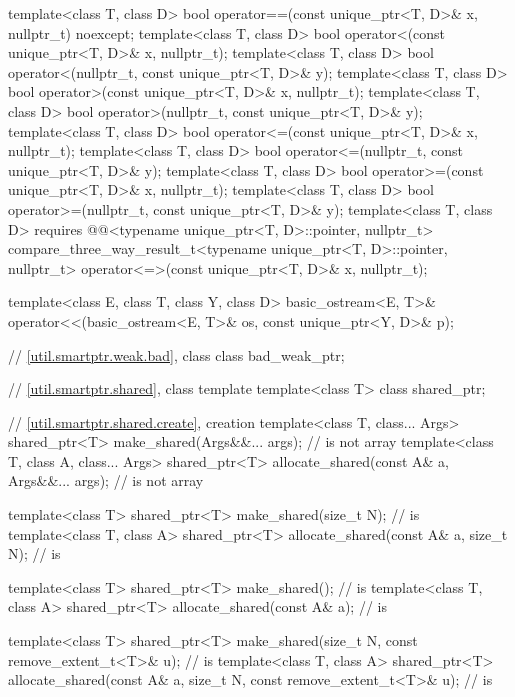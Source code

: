 \begin{codeblock}
{  template<class T, class D>
    bool operator==(const unique_ptr<T, D>& x, nullptr_t) noexcept;
  template<class T, class D>
    bool operator<(const unique_ptr<T, D>& x, nullptr_t);
  template<class T, class D>
    bool operator<(nullptr_t, const unique_ptr<T, D>& y);
  template<class T, class D>
    bool operator>(const unique_ptr<T, D>& x, nullptr_t);
  template<class T, class D>
    bool operator>(nullptr_t, const unique_ptr<T, D>& y);
  template<class T, class D>
    bool operator<=(const unique_ptr<T, D>& x, nullptr_t);
  template<class T, class D>
    bool operator<=(nullptr_t, const unique_ptr<T, D>& y);
  template<class T, class D>
    bool operator>=(const unique_ptr<T, D>& x, nullptr_t);
  template<class T, class D>
    bool operator>=(nullptr_t, const unique_ptr<T, D>& y);
  template<class T, class D>
    requires @@<typename unique_ptr<T, D>::pointer, nullptr_t>
    compare_three_way_result_t<typename unique_ptr<T, D>::pointer, nullptr_t>
      operator<=>(const unique_ptr<T, D>& x, nullptr_t);

  template<class E, class T, class Y, class D>
    basic_ostream<E, T>& operator<<(basic_ostream<E, T>& os, const unique_ptr<Y, D>& p);

  // \ref{util.smartptr.weak.bad}, class 
  class bad_weak_ptr;

  // \ref{util.smartptr.shared}, class template 
  template<class T> class shared_ptr;

  // \ref{util.smartptr.shared.create},  creation
  template<class T, class... Args>
    shared_ptr<T> make_shared(Args&&... args);                                  //  is not array
  template<class T, class A, class... Args>
    shared_ptr<T> allocate_shared(const A& a, Args&&... args);                  //  is not array

  template<class T>
    shared_ptr<T> make_shared(size_t N);                                        //  is 
  template<class T, class A>
    shared_ptr<T> allocate_shared(const A& a, size_t N);                        //  is 

  template<class T>
    shared_ptr<T> make_shared();                                                //  is 
  template<class T, class A>
    shared_ptr<T> allocate_shared(const A& a);                                  //  is 

  template<class T>
    shared_ptr<T> make_shared(size_t N, const remove_extent_t<T>& u);           //  is 
  template<class T, class A>
    shared_ptr<T> allocate_shared(const A& a, size_t N,
                                  const remove_extent_t<T>& u);                 //  is 

}
\end{codeblock}
